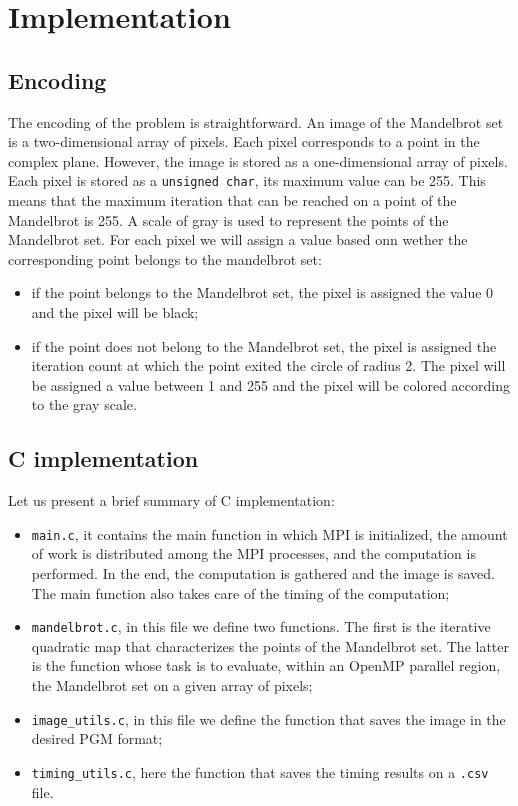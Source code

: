 \section{Implementation}

\subsection{Encoding}
The encoding of the problem is straightforward. An image of the Mandelbrot set is a two-dimensional array of pixels. Each pixel corresponds to a point in the complex plane. However, the image is stored as a one-dimensional array of pixels. Each pixel is stored as a \texttt{unsigned char}, its maximum value can be 255. This means that the maximum iteration that can be reached on a point of the Mandelbrot is 255. A scale of gray is used to represent the points of the Mandelbrot set. For each pixel we will assign a value based onn wether the corresponding point belongs to the mandelbrot set: 
\begin{itemize}
    \item if the point belongs to the Mandelbrot set, the pixel is assigned the value 0 and the pixel will be black;
    \item if the point does not belong to the Mandelbrot set, the pixel is assigned the iteration count at which the point exited the circle of radius 2. The pixel will be assigned a value between 1 and 255 and the pixel will be colored according to the gray scale.
\end{itemize}

\subsection{C implementation}
Let us present a brief summary of C implementation:
\begin{itemize}
    \item \texttt{main.c}, it contains the main function in which MPI is initialized, the amount of work is distributed among the MPI processes, and the computation is performed. In the end, the computation is gathered and the image is saved. The main function also takes care of the timing of the computation;
    \item \texttt{mandelbrot.c}, in this file we define two functions. The first is the iterative quadratic map that characterizes the points of the Mandelbrot set. The latter is  the function whose task is to evaluate, within an OpenMP parallel region, the Mandelbrot set on a given array of pixels;
    \item \texttt{image\_utils.c}, in this file we define the function that saves the image in the desired PGM format;
    \item \texttt{timing\_utils.c}, here the function that saves the timing results on a \texttt{.csv} file.
\end{itemize}


